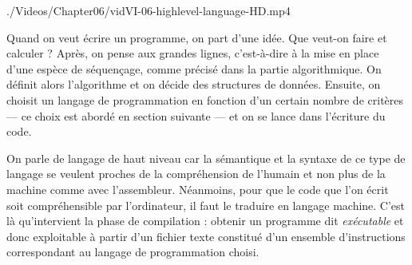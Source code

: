 \begin{marginvideo}
		{./Videos/Chapter06/vidVI-06-highlevel-language-HD.mp4}%
\end{marginvideo}

Quand on veut écrire un programme, on part d'une idée. Que veut-on faire et calculer ? Après, on pense aux grandes 
lignes, c'est-à-dire à la mise en place d'une espèce de séquençage, comme précisé dans la partie algorithmique. On définit alors l'algorithme et on décide des structures de données. Ensuite, on choisit un langage de programmation en fonction d'un certain nombre de critères --- ce choix est abordé en section suivante --- et on se lance dans l'écriture du code. 

On parle de langage de haut niveau car la sémantique et la syntaxe de ce type de langage se veulent proches de la compréhension de l'humain et non plus de la machine comme avec l'assembleur. Néanmoins, pour que le code que l'on écrit soit compréhensible par l'ordinateur, il faut le traduire en langage machine. C'est là qu'intervient la phase de compilation : obtenir un programme dit \emph{exécutable} et donc exploitable à partir d'un fichier texte constitué d'un ensemble d'instructions correspondant au langage de programmation choisi.

